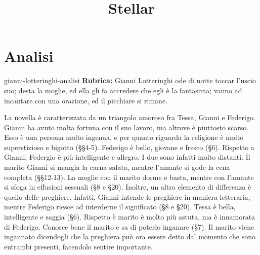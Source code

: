 \documentclass[preview]{standalone}
\begin{document}
\title{Stellar}
\genpage

\section{Analisi}

\begin{snippet}{gianni-lotteringhi-analisi}
    \textbf{Rubrica:} Gianni Lotteringhi ode di notte toccar l'uscio suo; desta la moglie, ed ella gli fa accredere che egli è la fantasima; vanno ad incantare con una orazione, ed il picchiare si rimane.

    
    La novella è caratterizzata da un triangolo amoroso fra Tessa, Gianni e Federigo.
    Gianni ha avuto molta fortuna con il suo lavoro, ma altrove è piuttosto scarso.
    Esso è una persona molto ingenua, e per quanto riguarda la religione è molto
    superstizioso e bigotto (§§4-5).
    Federigo è bello, giovane e fresco (§6).
    Rispetto a Gianni, Federgio è più intelligente e allegro.
    I due sono infatti molto distanti.
    Il marito Gianni si mangia la carna salata, mentre l'amante si gode la cena completa (§§12-13).
    La moglie con il marito dorme e basta, mentre con l'amante si sfoga in effusioni sessuali (§8 e §20).
    Inoltre, un altro elemento di differenza è quello delle preghiere. Infatti, Gianni intende le preghiere in maniera letteraria,
    mentre Federigo riesce ad interderne il significato (§8 e §20).
    Tessa è bella, intelligente e saggia (§6). Rispetto è marito è molto più astuta, ma è innamorata di Federigo.
    Conosce bene il marito e sa di poterlo inganare (§7).
    Il marito viene ingannato dicendogli che la preghiera può ora essere detto dal momento che sono
    entrambi presenti, facendolo sentire importante.
    
    
\end{snippet}
\end{document}
